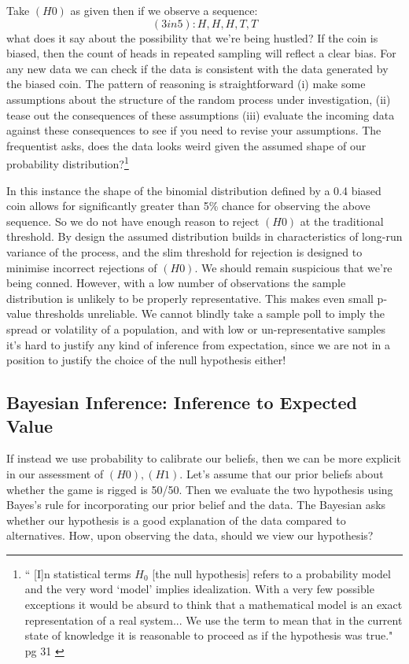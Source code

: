\documentclass{tufte-handout}
\begin{document}
\noindent Take $(H0)$ as given then if we observe a sequence: $$ (3in5): H, H, H, T, T$$ what does it say about the possibility that we're being hustled? If the coin is biased, then the count of heads in repeated sampling will reflect a clear bias. For any new data we can check if the data is consistent with the data generated by the biased coin. The pattern of reasoning is straightforward (i) make some assumptions about the structure of the random process under investigation, (ii) tease out the consequences of these assumptions (iii) evaluate the incoming data against these consequences to see if you need to revise your assumptions. The frequentist asks, does the data looks weird given the assumed shape of our probability distribution?\footnote{`` [I]n statistical terms $H_{0}$ [the null hypothesis] refers to a probability model and the very word `model' implies idealization. With a very few possible exceptions it would be absurd to think  that a mathematical model is an exact representation of a real system... We use the term to mean that in the current state of knowledge it is reasonable to proceed as if the hypothesis was true." pg 31 \cite{cox2006pos}}
\linebreak

\noindent In this instance the shape of the binomial distribution defined by a 0.4 biased coin allows for significantly greater than  5\% chance for observing the above sequence. So we do not have enough reason to reject $(H0)$ at the traditional threshold. By design the assumed distribution builds in characteristics of long-run variance of the process, and the slim threshold for rejection is designed to minimise incorrect rejections of $(H0)$. We should remain suspicious that we're being conned. However, with a low number of observations the sample distribution is unlikely to be properly representative. This makes even small p-value thresholds unreliable. We cannot blindly take a sample poll to imply the spread or volatility of a population, and with low or un-representative samples it's hard to justify any kind of inference from expectation, since we are not in a position to justify the choice of the null hypothesis either!

\subsection{Bayesian Inference: Inference to Expected Value}
If instead we use probability to calibrate our beliefs, then we can be more explicit in our assessment of $(H0), (H1)$. Let's assume that our prior beliefs about whether the game is rigged is 50/50. Then we evaluate the two hypothesis using Bayes's rule for incorporating our prior belief and the data. The Bayesian asks whether our hypothesis is a good explanation of the data compared to alternatives. How, upon observing the data, should we view our hypothesis?
\end{document}
